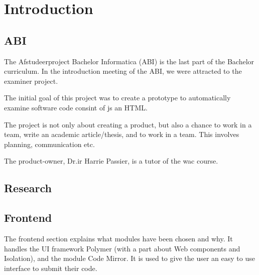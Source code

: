 \chapter{Introduction}



\section{ABI} 

The Afstudeerproject Bachelor Informatica (ABI) is the last part of the Bachelor curriculum.
In the introduction meeting of the ABI, we were attracted to the \gls{examiner} project.

The initial goal of this project was to create a prototype to automatically examine
software code consint of \gls{js} an HTML.

The project is not only about creating a product, but also a chance to work in a team, write an academic article/thesis, and to work in a team. This involves planning, communication etc.

The product-owner, Dr.ir Harrie Passier, is a tutor of the \gls{wac} course.



\section{Research}


\section{Frontend}
The frontend section explains what modules have been chosen and why.
It handles the UI framework Polymer (with a part about Web components and
Isolation), and the module Code Mirror.
It is used to give
the user an easy to use interface to submit their code.

